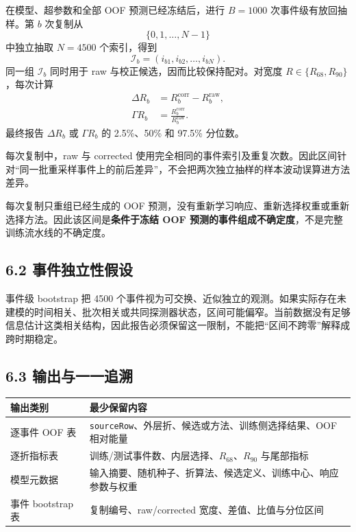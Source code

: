 \documentclass[UTF8,11pt,a4paper,oneside,fontset=none]{ctexart}
\newcommand{\Rsixtyeight}{R_{68}}
\newcommand{\Rninty}{R_{90}}
\begin{document}
在模型、超参数和全部 OOF 预测已经冻结后，进行 $B=1000$ 次事件级有放回抽样。第 $b$ 次复制从
\begin{equation}
  \{0,1,\ldots,N-1\}
\end{equation}
中独立抽取 $N=4500$ 个索引，得到
\begin{equation}
  \mathcal I_b=(i_{b1},i_{b2},\ldots,i_{bN}).
\end{equation}
同一组 $\mathcal I_b$ 同时用于 raw 与校正候选，因而比较保持配对。对宽度 $R\in\{\Rsixtyeight,\Rninty\}$，每次计算
\begin{align}
  \Delta R_b
  &=R_b^{\mathrm{corr}}-R_b^{\mathrm{raw}},\\
  \Gamma R_b
  &=\frac{R_b^{\mathrm{corr}}}{R_b^{\mathrm{raw}}}.
\end{align}
最终报告 $\Delta R_b$ 或 $\Gamma R_b$ 的 2.5\%、50\% 和 97.5\% 分位数。

\begin{methodbox}[title={“配对”的含义},fonttitle=\bfseries]
每次复制中，raw 与 corrected 使用完全相同的事件索引及重复次数。因此区间针对“同一批重采样事件上的前后差异”，不会把两次独立抽样的样本波动误算进方法差异。
\end{methodbox}

\begin{boundarybox}[title={bootstrap 的准确边界},fonttitle=\bfseries]
每次复制只重组已经生成的 OOF 预测，没有重新学习响应、重新选择权重或重新选择方法。因此该区间是\textbf{条件于冻结 OOF 预测的事件组成不确定度}，不是完整训练流水线的不确定度。
\end{boundarybox}

\subsection*{6.2 事件独立性假设}

事件级 bootstrap 把 4500 个事件视为可交换、近似独立的观测。如果实际存在未建模的时间相关、批次相关或共同探测器状态，区间可能偏窄。当前数据没有足够信息估计这类相关结构，因此报告必须保留这一限制，不能把“区间不跨零”解释成跨时期稳定。

\subsection*{6.3 输出与一一追溯}

\begin{tabularx}{\textwidth}{@{}C{4.0cm} Y@{}}
\toprule
{}\textbf{输出类别} & \textbf{最少保留内容}\\
\midrule
逐事件 OOF 表 & \texttt{sourceRow}、外层折、候选或方法、训练侧选择结果、OOF 相对能量\\
逐折指标表 & 训练/测试事件数、内层选择、$\Rsixtyeight$、$\Rninty$ 与尾部指标\\
模型元数据 & 输入摘要、随机种子、折算法、候选定义、训练中心、响应参数与权重\\
事件 bootstrap 表 & 复制编号、raw/corrected 宽度、差值、比值与分位区间\\
\bottomrule
\end{tabularx}
\end{document}
